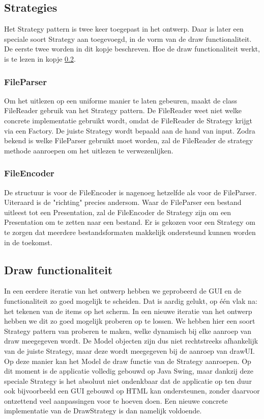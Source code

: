 \documentclass[a4paper]{article}
\newcommand{\1}[0]{\'{e}\'{e}n}
\begin{document}
\subsection{Strategies}
Het Strategy pattern is twee keer toegepast in het ontwerp. Daar is later een speciale soort Strategy aan toegevoegd, in de vorm van de draw functionaliteit. De eerste twee worden in dit kopje beschreven. Hoe de draw functionaliteit werkt, is te lezen in kopje \ref{sub:drawFunc}.

\subsubsection{FileParser}
Om het uitlezen op een uniforme manier te laten gebeuren, maakt de class FileReader gebruik van het Strategy pattern. De FileReader weet niet welke concrete implementatie gebruikt wordt, omdat de FileReader de Strategy krijgt via een Factory. De juiste Strategy wordt bepaald aan de hand van input. Zodra bekend is welke FileParser gebruikt moet worden, zal de FileReader de strategy methode aanroepen om het uitlezen te verwezenlijken.

\subsubsection{FileEncoder}
De structuur is voor de FileEncoder is nagenoeg hetzelfde als voor de FileParser. Uiteraard is de "richting" precies andersom. Waar de FileParser een bestand uitleest tot een Presentation, zal de FileEncoder de Strategy zijn om een Presentation om te zetten naar een bestand. Er is gekozen voor een Strategy om te zorgen dat meerdere bestandsformaten makkelijk ondersteund kunnen worden in de toekomst.

\subsection{Draw functionaliteit}
\label{sub:drawFunc}
In een eerdere iteratie van het ontwerp hebben we geprobeerd de GUI en de functionaliteit zo goed mogelijk te scheiden. Dat is aardig gelukt, op \1 vlak na: het tekenen van de items op het scherm. In een nieuwe iteratie van het ontwerp hebben we dit zo goed mogelijk proberen op te lossen. We hebben hier een soort Strategy pattern van proberen te maken, welke dynamisch bij elke aanroep van draw meegegeven wordt. De Model objecten zijn dus niet rechtstreeks afhankelijk van de juiste Strategy, maar deze wordt meegegeven bij de aanroep van drawUI. Op deze manier kan het Model de draw functie van de Strategy aanroepen. Op dit moment is de applicatie volledig gebouwd op Java Swing, maar dankzij deze speciale Strategy is het absoluut niet ondenkbaar dat de applicatie op ten duur ook bijvoorbeeld een GUI gebouwd op HTML kan ondersteunen, zonder daarvoor ontzettend veel aanpassingen voor te hoeven doen. Een nieuwe concrete implementatie van de DrawStrategy is dan namelijk voldoende.
\end{document}
